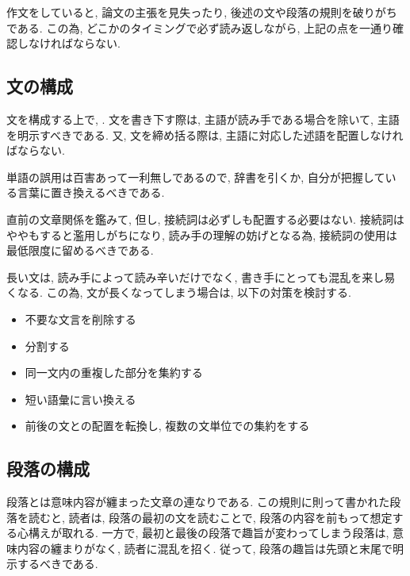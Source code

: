 \documentclass[12pt,xelatex,ja=standard]{bxjsarticle}
\begin{document}
作文をしていると,
論文の主張を見失ったり,
後述の文や段落の規則を破りがちである.
この為, どこかのタイミングで必ず読み返しながら,
上記の点を一通り確認しなければならない.

\subsection{文の構成}
文を構成する上で,
.
文を書き下す際は, 主語が読み手である場合を除いて,
主語を明示すべきである.
又, 文を締め括る際は,
主語に対応した述語を配置しなければならない.

単語の誤用は百害あって一利無しであるので,
辞書を引くか, 自分が把握している言葉に置き換えるべきである.

直前の文章関係を鑑みて,
但し, 接続詞は必ずしも配置する必要はない.
接続詞はややもすると濫用しがちになり,
読み手の理解の妨げとなる為,
接続詞の使用は最低限度に留めるべきである.

長い文は, 読み手によって読み辛いだけでなく,
書き手にとっても混乱を来し易くなる.
この為,
文が長くなってしまう場合は, 以下の対策を検討する.
\begin{itemize}
\item 不要な文言を削除する
\item 分割する
\item 同一文内の重複した部分を集約する
\item 短い語彙に言い換える
\item 前後の文との配置を転換し, 複数の文単位での集約をする
\end{itemize}

\subsection{段落の構成}
段落とは意味内容が纏まった文章の連なりである.
この規則に則って書かれた段落を読むと,
読者は, 段落の最初の文を読むことで,
段落の内容を前もって想定する心構えが取れる.
一方で, 最初と最後の段落で趣旨が変わってしまう段落は,
意味内容の纏まりがなく,
読者に混乱を招く.
従って, 段落の趣旨は先頭と末尾で明示するべきである.
\end{document}
